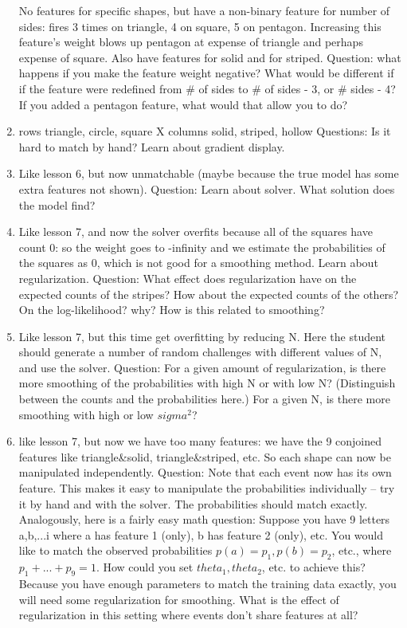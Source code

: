 \documentclass[11pt,letterpaper]{article}
\begin{document}
\begin{enumerate}
No features for specific shapes, but have a non-binary feature for number of sides: fires 3 times on triangle, 4 on square, 5 on pentagon.  Increasing this feature’s weight blows up pentagon at expense of triangle and perhaps expense of square.  Also have features for solid and for striped.
Question: what happens if you make the feature weight negative?  What would be different if if the feature were redefined from \# of sides to \# of sides - 3, or \# sides - 4?  If you added a pentagon feature, what would that allow you to do?
\item rows {triangle, circle, square} X columns {solid, striped, hollow}
Questions: Is it hard to match by hand?  Learn about gradient display.
\item Like lesson 6, but now unmatchable (maybe because the true model has some extra features not shown).  
Question: Learn about solver.  What solution does the model find?
\item Like lesson 7, and now the solver overfits because all of the squares have count 0: so the weight goes to -infinity and we estimate the probabilities of the squares as 0, which is not good for a smoothing method.  Learn about regularization.  Question: What effect does regularization have on the expected counts of the stripes?  How about the expected counts of the others?  On the log-likelihood? why? How is this related to smoothing?  
\item Like lesson 7, but this time get overfitting by reducing N.  Here the student should generate a number of random challenges with different values of N, and use the solver.  Question: For a given amount of regularization, is there more smoothing of the probabilities with high N or with low N?  (Distinguish between the counts and the probabilities here.)  For a given N, is there more smoothing with high or low $sigma^2$?
\item like lesson 7, but now we have too many features: we have the 9 conjoined features like triangle\&solid, triangle\&striped, etc.  So each shape can now be manipulated independently.
Question:  Note that each event now has its own feature.  This makes it easy to manipulate the probabilities individually -- try it by hand and with the solver.  The probabilities should match exactly.  Analogously, here is a fairly easy math question: Suppose you have 9 letters a,b,...i where a has feature 1 (only), b has feature 2 (only), etc.  You would like to match the observed probabilities $p(a)=p_1, p(b)=p_2$, etc., where $p_1+...+p_9=1$.  How could you set $theta_1, theta_2$, etc. to achieve this?   Because you have enough parameters to match the training data exactly, you will need some regularization for smoothing.  What is the effect of regularization in this setting where events don’t share features at all? 

\end{enumerate}
\end{document}
